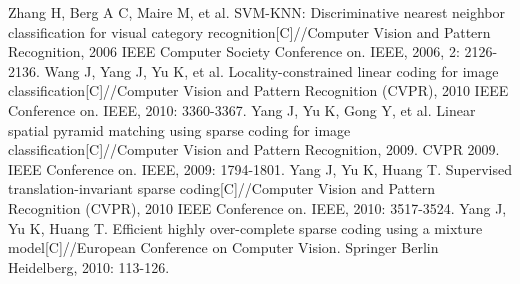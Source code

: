 \documentclass{llncs}
\begin{document}
\begin{thebibliography}{1}
		Zhang H, Berg A C, Maire M, et al. SVM-KNN: Discriminative nearest neighbor classification for visual category recognition[C]//Computer Vision and Pattern Recognition, 2006 IEEE Computer Society Conference on. IEEE, 2006, 2: 2126-2136.
		Wang J, Yang J, Yu K, et al. Locality-constrained linear coding for image classification[C]//Computer Vision and Pattern Recognition (CVPR), 2010 IEEE Conference on. IEEE, 2010: 3360-3367.
		Yang J, Yu K, Gong Y, et al. Linear spatial pyramid matching using sparse coding for image classification[C]//Computer Vision and Pattern Recognition, 2009. CVPR 2009. IEEE Conference on. IEEE, 2009: 1794-1801.
		Yang J, Yu K, Huang T. Supervised translation-invariant sparse coding[C]//Computer Vision and Pattern Recognition (CVPR), 2010 IEEE Conference on. IEEE, 2010: 3517-3524.
		Yang J, Yu K, Huang T. Efficient highly over-complete sparse coding using a mixture model[C]//European Conference on Computer Vision. Springer Berlin Heidelberg, 2010: 113-126.
	\end{thebibliography}
\end{document}
